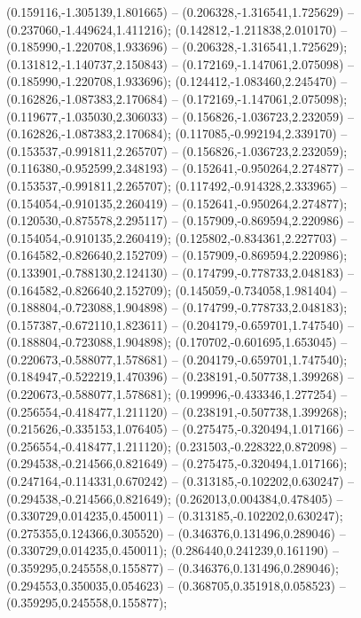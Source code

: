  (0.159116,-1.305139,1.801665) -- (0.206328,-1.316541,1.725629) -- (0.237060,-1.449624,1.411216);
 (0.142812,-1.211838,2.010170) -- (0.185990,-1.220708,1.933696) -- (0.206328,-1.316541,1.725629);
 (0.131812,-1.140737,2.150843) -- (0.172169,-1.147061,2.075098) -- (0.185990,-1.220708,1.933696);
 (0.124412,-1.083460,2.245470) -- (0.162826,-1.087383,2.170684) -- (0.172169,-1.147061,2.075098);
 (0.119677,-1.035030,2.306033) -- (0.156826,-1.036723,2.232059) -- (0.162826,-1.087383,2.170684);
 (0.117085,-0.992194,2.339170) -- (0.153537,-0.991811,2.265707) -- (0.156826,-1.036723,2.232059);
 (0.116380,-0.952599,2.348193) -- (0.152641,-0.950264,2.274877) -- (0.153537,-0.991811,2.265707);
 (0.117492,-0.914328,2.333965) -- (0.154054,-0.910135,2.260419) -- (0.152641,-0.950264,2.274877);
 (0.120530,-0.875578,2.295117) -- (0.157909,-0.869594,2.220986) -- (0.154054,-0.910135,2.260419);
 (0.125802,-0.834361,2.227703) -- (0.164582,-0.826640,2.152709) -- (0.157909,-0.869594,2.220986);
 (0.133901,-0.788130,2.124130) -- (0.174799,-0.778733,2.048183) -- (0.164582,-0.826640,2.152709);
 (0.145059,-0.734058,1.981404) -- (0.188804,-0.723088,1.904898) -- (0.174799,-0.778733,2.048183);
 (0.157387,-0.672110,1.823611) -- (0.204179,-0.659701,1.747540) -- (0.188804,-0.723088,1.904898);
 (0.170702,-0.601695,1.653045) -- (0.220673,-0.588077,1.578681) -- (0.204179,-0.659701,1.747540);
 (0.184947,-0.522219,1.470396) -- (0.238191,-0.507738,1.399268) -- (0.220673,-0.588077,1.578681);
 (0.199996,-0.433346,1.277254) -- (0.256554,-0.418477,1.211120) -- (0.238191,-0.507738,1.399268);
 (0.215626,-0.335153,1.076405) -- (0.275475,-0.320494,1.017166) -- (0.256554,-0.418477,1.211120);
 (0.231503,-0.228322,0.872098) -- (0.294538,-0.214566,0.821649) -- (0.275475,-0.320494,1.017166);
 (0.247164,-0.114331,0.670242) -- (0.313185,-0.102202,0.630247) -- (0.294538,-0.214566,0.821649);
 (0.262013,0.004384,0.478405) -- (0.330729,0.014235,0.450011) -- (0.313185,-0.102202,0.630247);
 (0.275355,0.124366,0.305520) -- (0.346376,0.131496,0.289046) -- (0.330729,0.014235,0.450011);
 (0.286440,0.241239,0.161190) -- (0.359295,0.245558,0.155877) -- (0.346376,0.131496,0.289046);
 (0.294553,0.350035,0.054623) -- (0.368705,0.351918,0.058523) -- (0.359295,0.245558,0.155877);
